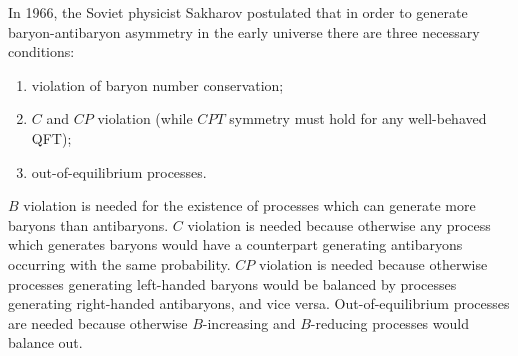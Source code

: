 \documentclass[main.tex]{subfiles}
\begin{document}

%
%

In 1966, the Soviet physicist Sakharov postulated that in order to generate baryon-antibaryon asymmetry in the early universe there are three necessary conditions:  
\begin{enumerate}
    \item violation of baryon number conservation;
    \item \(C\) and \(CP\) violation (while \(CPT\) symmetry must hold for any well-behaved QFT);
    \item out-of-equilibrium processes.
\end{enumerate}

\(B\) violation is needed for the existence of processes which can generate more baryons than antibaryons.
\(C\) violation is needed because otherwise any process which generates baryons would have a counterpart generating antibaryons occurring with the same probability. 
\(CP\) violation is needed because otherwise processes generating left-handed baryons would be balanced by processes generating right-handed antibaryons, and vice versa. 
Out-of-equilibrium processes are needed because otherwise \(B\)-increasing and \(B\)-reducing processes would balance out. 
\end{document}

